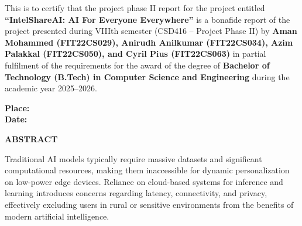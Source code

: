 \documentclass[12pt,a4paper]{report}
\begin{document}
\vspace{1cm}


\noindent This is to certify that the project phase II report for the project entitled \textbf{``IntelShareAI: AI For Everyone Everywhere''} is a bonafide report of the project presented during VIIIth semester (CSD416 -- Project Phase II) by \textbf{Aman Mohammed (FIT22CS029), Anirudh Anilkumar (FIT22CS034), Azim Palakkal (FIT22CS050), and Cyril Pius (FIT22CS063)} in partial fulfilment of the requirements for the award of the degree of \textbf{Bachelor of Technology (B.Tech) in Computer Science and Engineering} during the academic year 2025--2026.


\vspace{2.5cm}

\noindent
{}
\vspace{0.3cm}
\begin{flushleft} \textbf{Place:} \\[0.1cm] \textbf{Date:} \end{flushleft}


\newpage
\begin{center}
    \textbf{\large ABSTRACT}
\end{center}
\vspace{0.5cm}

\noindent
Traditional AI models typically require massive datasets and significant computational resources, making them inaccessible for dynamic personalization on low-power edge devices. Reliance on cloud-based systems for inference and learning introduces concerns regarding latency, connectivity, and privacy, effectively excluding users in rural or sensitive environments from the benefits of modern artificial intelligence.
\end{document}
